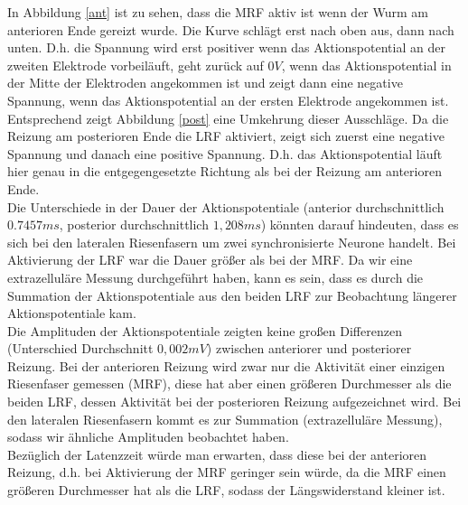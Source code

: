 \documentclass[11pt]{article}
\begin{document}
In Abbildung \ref{ant} ist zu sehen, dass die MRF aktiv ist wenn der Wurm am anterioren Ende gereizt wurde. Die Kurve schlägt erst nach oben aus, dann nach unten. D.h. die Spannung wird erst positiver wenn das Aktionspotential an der zweiten Elektrode vorbeiläuft, geht zurück auf $0V$, wenn das Aktionspotential in der Mitte der Elektroden angekommen ist und zeigt dann eine negative Spannung, wenn das Aktionspotential an der ersten Elektrode angekommen ist. \\
Entsprechend zeigt Abbildung \ref{post} eine Umkehrung dieser Ausschläge. Da die Reizung am posterioren Ende die LRF aktiviert, zeigt sich zuerst eine negative Spannung und danach eine positive Spannung. D.h. das Aktionspotential läuft hier genau in die entgegengesetzte Richtung als bei der Reizung am anterioren Ende. \\
Die Unterschiede in der Dauer der Aktionspotentiale (anterior durchschnittlich $0.7457ms$, posterior durchschnittlich $1,208ms$) könnten darauf hindeuten, dass es sich bei den lateralen Riesenfasern um zwei \glqq synchronisierte\grqq{} Neurone handelt. Bei Aktivierung der LRF war die Dauer größer als bei der MRF. Da wir eine extrazelluläre Messung durchgeführt haben, kann es sein, dass es durch die Summation der Aktionspotentiale aus den beiden LRF zur Beobachtung längerer Aktionspotentiale kam. \\
Die Amplituden der Aktionspotentiale zeigten keine großen Differenzen (Unterschied Durchschnitt $0,002mV$) zwischen anteriorer und posteriorer Reizung. Bei der anterioren Reizung wird zwar nur die Aktivität einer einzigen Riesenfaser gemessen (MRF), diese hat aber einen größeren Durchmesser als die beiden LRF, dessen Aktivität bei der posterioren Reizung aufgezeichnet wird. Bei den lateralen Riesenfasern kommt es zur Summation (extrazelluläre Messung), sodass wir ähnliche Amplituden beobachtet haben. \\
Bezüglich der Latenzzeit würde man erwarten, dass diese bei der anterioren Reizung, d.h. bei Aktivierung der MRF geringer sein würde, da die MRF einen größeren Durchmesser hat als die LRF, sodass der Längswiderstand kleiner ist. \\

\end{document}
